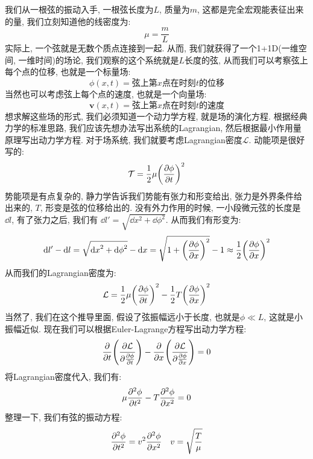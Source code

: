 我们从一根弦的振动入手, 一根弦长度为$L$, 质量为$m$, 这都是完全宏观能表征出来的量, 我们立刻知道他的线密度为:
\begin{equation}
  \mu = \frac{m}{L}
\end{equation}
实际上, 一个弦就是无数个质点连接到一起.
从而, 我们就获得了一个1+1D(一维空间, 一维时间)的场论, 我们观察的这个系统就是$L$长度的弦, 从而我们可以考察弦上每个点的位移, 也就是一个标量场:
\begin{equation}
  \phi(x,t) = \text{弦上第$x$点在时刻$t$的位移}
\end{equation}
当然也可以考虑弦上每个点的速度, 也就是一个向量场:
\begin{equation}
  \bm{v}(x,t) = \text{弦上第$x$点在时刻$t$的速度}
\end{equation}
想求解这些场的形式, 我们必须知道一个动力学方程, 就是场的演化方程.
根据经典力学的标准思路, 我们应该先想办法写出系统的Lagrangian, 然后根据最小作用量原理写出动力学方程.
对于场系统, 我们就要考虑Lagrangian密度$\mathcal{L}$.
动能项是很好写的:
\begin{equation}
  \mathcal{T} = \frac{1}{2} \mu \pqty{\pdv{\phi}{t}}^2
\end{equation}
势能项是有点复杂的, 静力学告诉我们势能有张力和形变给出, 张力是外界条件给出来的, $T$, 形变是弦的位移给出的.
没有外力作用的时候, 一小段微元弦的长度是 $\dd{l}$, 有了张力之后, 我们有 $\dd{l'} = \sqrt{\dd{x}^2 + \dd{\phi}^2}$.
从而我们有形变为:
\begin{equation}
  \dd{l'}-\dd{l} = \sqrt{\dd{x}^2 + \dd{\phi}^2} - \dd{x} = \sqrt{1 + \pqty{\pdv{\phi}{x}}^2} - 1 \approx \frac{1}{2} \pqty{\pdv{\phi}{x}}^2
\end{equation}
从而我们的Lagrangian密度为:
\begin{equation}
  \mathcal{L} = \frac{1}{2} \mu \pqty{\pdv{\phi}{t}}^2 - \frac{1}{2} T \pqty{\pdv{\phi}{x}}^2
\end{equation}
当然了, 我们在这个推导里面, 假设了弦振幅远小于长度, 也就是$\phi \ll L$, 这就是小振幅近似.
现在我们可以根据Euler-Lagrange方程写出动力学方程:
\begin{equation}
  \pdv{}{t} \pqty{\pdv{\mathcal{L}}{\pdv{\phi}{t}}} - \pdv{}{x} \pqty{\pdv{\mathcal{L}}{\pdv{\phi}{x}}} = 0
\end{equation}
将Lagrangian密度代入, 我们有:
\begin{equation}
  \mu \pdv[2]{\phi}{t} - T \pdv[2]{\phi}{x} = 0
\end{equation}
整理一下, 我们有弦的振动方程:
\begin{equation}
  \pdv[2]{\phi}{t} = v^2 \pdv[2]{\phi}{x} \quad v = \sqrt{\frac{T}{\mu}}
\end{equation}
